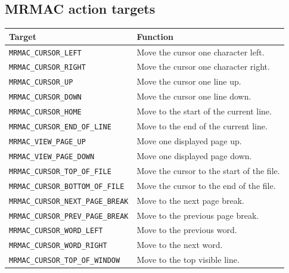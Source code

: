 \documentclass[a4paper,10pt,twoside,openany]{book}
\newenvironment{mrmacextension}{\begin{changebar}}{\end{changebar}}
\begin{document}
\begin{mrmacextension}
\section{MRMAC action targets}
\begin{longtable}{@{}L{0.50\textwidth}@{\hspace{0.8em}}L{0.40\textwidth}@{}}
\toprule
Target & Function \\
\midrule
\endhead
\texttt{MRMAC\_CURSOR\_LEFT} & Move the cursor one character left. \\
\texttt{MRMAC\_CURSOR\_RIGHT} & Move the cursor one character right. \\
\texttt{MRMAC\_CURSOR\_UP} & Move the cursor one line up. \\
\texttt{MRMAC\_CURSOR\_DOWN} & Move the cursor one line down. \\
\texttt{MRMAC\_CURSOR\_HOME} & Move to the start of the current line. \\
\texttt{MRMAC\_CURSOR\_END\_OF\_LINE} & Move to the end of the current line. \\
\texttt{MRMAC\_VIEW\_PAGE\_UP} & Move one displayed page up. \\
\texttt{MRMAC\_VIEW\_PAGE\_DOWN} & Move one displayed page down. \\
\texttt{MRMAC\_CURSOR\_TOP\_OF\_FILE} & Move the cursor to the start of the file. \\
\texttt{MRMAC\_CURSOR\_BOTTOM\_OF\_FILE} & Move the cursor to the end of the file. \\
\texttt{MRMAC\_CURSOR\_NEXT\_PAGE\_BREAK} & Move to the next page break. \\
\texttt{MRMAC\_CURSOR\_PREV\_PAGE\_BREAK} & Move to the previous page break. \\
\texttt{MRMAC\_CURSOR\_WORD\_LEFT} & Move to the previous word. \\
\texttt{MRMAC\_CURSOR\_WORD\_RIGHT} & Move to the next word. \\
\texttt{MRMAC\_CURSOR\_TOP\_OF\_WINDOW} & Move to the top visible line. \\

\end{longtable}
\end{mrmacextension}
\end{document}
